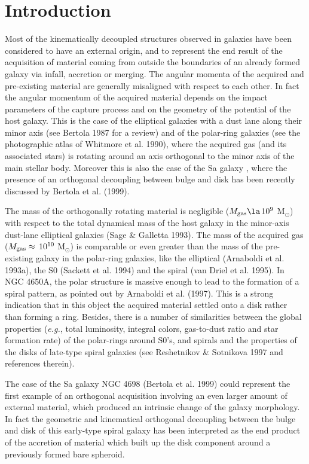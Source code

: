 \documentclass[twocolumns]{aa}
\def\msun{M$_{\odot}$}
\begin{document}
\section{Introduction}
\label{sec:n4672_introduction}

Most of the kinematically decoupled structures observed in ga\-laxies
have been considered to have an external origin, and to represent
the end result of the acquisition of material coming from outside the
boundaries of an already formed galaxy via infall, accretion or
merging. The angular momenta of the acquired and pre-existing material
are generally misaligned with respect to each other. In fact the
angular momentum of the acquired material depends on the impact
parameters of the capture process and on the geometry of the potential
of the host galaxy. This is the case of the elliptical galaxies with a
dust lane along their minor axis (see Bertola 1987 for a review) and
of the polar-ring galaxies (see the photographic atlas of Whitmore et
al. 1990), where the acquired gas (and its associated stars) is
rotating around an axis orthogonal to the minor axis of the main
stellar body.  Moreover this is also the case of the Sa galaxy
, where the presence of an orthogonal decoupling
between bulge and disk has been recently discussed by Bertola et
al. (1999).

The mass of the orthogonally rotating material is negligible ($M_{\rm
gas}\la\,10^9$ \msun) with respect to the total dynamical mass of the
host galaxy in the minor-axis dust-lane elliptical galaxies (Sage \&
Galletta 1993). The mass of the acquired gas ($M_{\rm
gas}\approx\,10^{10}$ \msun) is comparable or even greater than the
mass of the pre-existing galaxy in the polar-ring galaxies, like the
elliptical  (Arnaboldi et al. 1993a), the S0
 (Sackett et al. 1994) and the spiral  (van Driel et al. 1995).  In NGC 4650A, the polar structure is
massive enough to lead to the formation of a spiral pattern, as
pointed out by Arnaboldi et al. (1997). This is a strong indication
that in this object the acquired material settled onto a disk rather
than forming a ring. Besides, there is a number of similarities
between the global properties ({\it e.g.\/}, total luminosity,
integral colors, gas-to-dust ratio and star formation rate) of the
polar-rings around S0's, and spirals and the properties of the
disks of late-type spiral galaxies (see Reshetnikov \& Sotnikova 1997
and references therein).
 
The case of the Sa galaxy NGC 4698 (Bertola et al. 1999) could
represent the first example of an orthogonal acquisition involving an
even larger amount of external material, which produced an intrinsic
change of the galaxy morphology. In fact the geometric and kinematical
orthogonal decoupling between the bulge and disk of this early-type
spiral galaxy has been interpreted as the end product of the accretion
of material which built up the disk component around a previously
formed bare spheroid.
\end{document}
